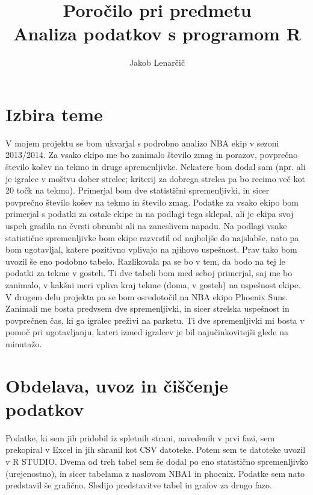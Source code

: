 \documentclass[11pt,a4paper]{article}
\begin{document}
\title{Poročilo pri predmetu \\
Analiza podatkov s programom R}
\author{Jakob Lenarčič}
\maketitle

\section{Izbira teme}

V mojem projektu se bom ukvarjal s podrobno analizo NBA ekip v sezoni 2013/2014. Za vsako ekipo me bo zanimalo število zmag in porazov, povprečno število košev na tekmo in druge spremenljivke. Nekatere bom dodal sam (npr. ali je igralec v moštvu dober strelec; kriterij za dobrega strelca pa bo recimo več kot 20 točk na tekmo). Primerjal bom dve statistični spremenljivki, in sicer povprečno število košev na tekmo in število zmag. Podatke za vsako ekipo bom primerjal s podatki za ostale ekipe in na podlagi tega sklepal, ali je ekipa svoj uspeh gradila na čvrsti obrambi ali na zaneslivem napadu. Na podlagi vsake statistične spremenljivke bom ekipe razvrstil od najboljše do najslabše, nato pa bom ugotavljal, katere pozitivno vplivajo na njihovo uspešnost.
Prav tako bom uvozil še eno podobno tabelo. Razlikovala pa se bo v tem, da bodo na tej le podatki za tekme v gosteh. Ti dve tabeli bom med seboj primerjal, saj me bo zanimalo, v kakšni meri vpliva kraj tekme (doma, v gosteh) na uspešnost ekipe.
V drugem delu projekta pa se bom osredotočil na NBA ekipo Phoenix Suns. Zanimali me bosta predvsem dve spremenljivki, in sicer strelska uspešnost in povprečnen čas, ki ga igralec preživi na parketu. Ti dve   spremenljivki mi bosta v pomoč pri ugotavljanju, kateri izmed igralcev je bil najučinkovitejši glede na minutažo.



\section{Obdelava, uvoz in čiščenje podatkov}

Podatke, ki sem jih pridobil iz spletnih strani, navedenih v prvi fazi, sem prekopiral v Excel in jih shranil kot CSV datoteke. Potem sem te datoteke uvozil v R STUDIO. Dvema od treh tabel sem še dodal po eno statistično spremenljivko (urejenostno), in sicer tabelama z naslovom NBA1 in phoenix. Podatke sem nato predstavil še grafično. Sledijo predstavitve tabel in grafov za drugo fazo.\\
\newpage
\end{document}
